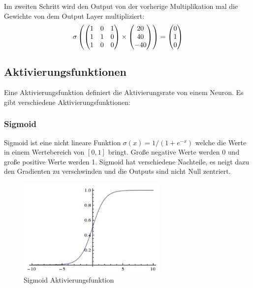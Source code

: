 Im zweiten Schritt wird den Output von der vorherige Multiplikation mal die Gewichte von dem Output Layer multipliziert:
\begin{equation}
  \vspace{5pt}
  \sigma \left(
  \begin{pmatrix}
    1 &0 &1 \\
    1 &1 &0 \\
    1 &0 &0
  \end{pmatrix}
  \times
  \begin{pmatrix}
    20 \\
    40 \\
    -40
  \end{pmatrix}
  \right)
  =
  \begin{pmatrix}
    0 \\
    1 \\
    0
  \end{pmatrix}
\end{equation}

\subsection{Aktivierungsfunktionen}\label{subsection:aktivierungsfunktionen}
Eine Aktivierungsfunktion definiert die Aktivierungsrate von einem Neuron. Es gibt verschiedene Aktivierungsfunktionen:

\subsubsection{Sigmoid}
Sigmoid ist eine nicht lineare Funktion $ \sigma(x) = 1 / (1 + e^{-x})$ welche die Werte in einem Wertebereich von $ [0, 1] $ bringt.
Große negative Werte werden 0 und große positive Werte werden 1. Sigmoid hat verschiedene Nachteile, es neigt dazu den Gradienten zu verschwinden
und die Outputs sind nicht Null zentriert.

\begin{figure}[H]
  \centering
  \includegraphics[width=0.65\textwidth]{resources/nn/sigmoid.png}
  \caption{
    Sigmoid Aktivierungsfunktion 
    \cite{neuron-model}
  }
  \label{image:sigmoid}
\end{figure}

